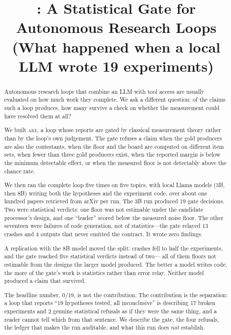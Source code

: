\documentclass[11pt]{article}
\title{\toolname{}: A Statistical Gate for Autonomous Research Loops\\
       \large (What happened when a local LLM wrote 19 experiments)}
\author{}
\date{}
\newcommand{\toolname}{\textsc{arx}}
\begin{document}
\maketitle

\begin{abstract}
Autonomous research loops that combine an LLM with tool access are usually
evaluated on how much work they complete. We ask a different question: of the
claims such a loop produces, how many survive a check on whether the
measurement could have resolved them at all?

We built \toolname{}, a loop whose reports are gated by classical measurement
theory rather than by the loop's own judgement. The gate refuses a claim when
the gold producers are also the contestants, when the floor and the board are
computed on different item sets, when fewer than three gold producers exist,
when the reported margin is below the minimum detectable effect, or when the
measured floor is not detectably above the chance rate.

We then ran the complete loop five times on five topics, with local Llama
models (3B, then 8B) writing both the hypotheses and the experiment code, over
about one hundred papers retrieved from arXiv per run. The 3B run produced 19
gate decisions. Two were
statistical verdicts: one floor was not estimable under the candidate
processor's design, and one ``leader'' scored below the measured noise floor.
The other seventeen were failures of code generation, not of statistics---the
gate relayed 13 crashes and 4 outputs that never emitted the contract. It
wrote zero findings.

A replication with the 8B model moved the split: crashes fell to half the
experiments, and the gate reached five statistical verdicts instead of two---
all of them floors not estimable from the designs the larger model produced.
The better a model writes code, the more of the gate's work is statistics
rather than error relay. Neither model produced a claim that survived.

The headline number, 0/19, is not the contribution. The contribution is the
separation: a loop that reports ``19 hypotheses tested, all inconclusive'' is
describing 17 broken experiments and 2 genuine statistical refusals as if
they were the same thing, and a reader cannot tell which from that sentence.
We describe the gate, the four refusals, the ledger that makes the run
auditable, and what this run does \emph{not} establish.
\end{abstract}
\end{document}
